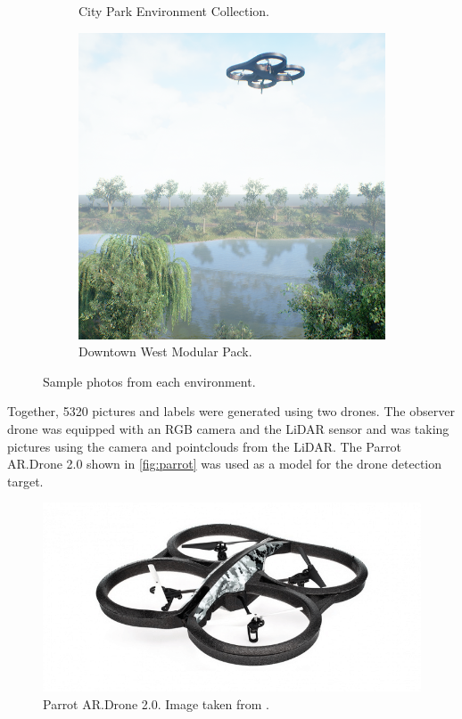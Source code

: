 \documentclass[twoside]{ctuthesis}
\theoremstyle{plain}
\theoremstyle{definition}
\theoremstyle{note}
\begin{document}
\begin{figure}
\begin{subfigure}[b]{0.3\textwidth}
		\caption{City Park Environment Collection.}
	\end{subfigure}
	\hfill
	\begin{subfigure}[b]{0.3\textwidth}
		\centering
		\includegraphics[width=\textwidth]{park_rgb.png}
		\caption{Downtown West Modular Pack.}
	\end{subfigure}
	\caption{Sample photos from each environment.}
	\label{fig:ue_env}
\end{figure}
Together, 5320 pictures and labels were generated using two drones. The observer drone was equipped with an RGB camera and the LiDAR sensor and was taking pictures using the camera and pointclouds from the LiDAR. The Parrot AR.Drone 2.0 shown in \autoref{fig:parrot} was used as a model for the drone detection target.
\begin{figure}
	\centering
	\includegraphics[width=\textwidth]{parrot.png}
	\caption[Parrot AR.Drone 2.0.]{Parrot AR.Drone 2.0. Image taken from \cite{parrot}.}
	\label{fig:parrot}
\end{figure}
\end{document}
